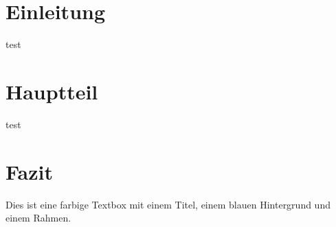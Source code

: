 \documentclass{book}
\begin{document}
\tableofcontents %
\newpage

\chapter{Einleitung}
\blindtext
test

\chapter{Hauptteil}
\blindtext
test

\chapter{Fazit}
\blindtext

\begin{tcolorbox}[colback=blue!5!white, colframe=blue!75!black, title=Beispiel-Titel, width=\textwidth]
Dies ist eine farbige Textbox mit einem Titel, einem blauen Hintergrund und einem Rahmen.
\end{tcolorbox}
\end{document}
